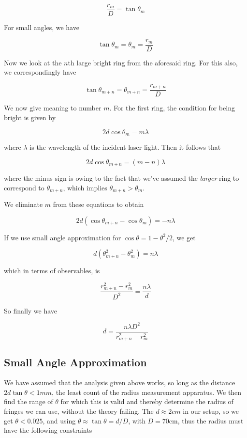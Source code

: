 \[
\frac{r_{m}}{D}=\tan\theta_{m}
\]


For small angles, we have

\[
\tan\theta_{m}=\theta_{m}=\frac{r_{m}}{D}
\]


Now we look at the $n$th large bright ring from the aforesaid ring.
For this also, we correspondingly have

\[
\tan\theta_{m+n}=\theta_{m+n}=\frac{r_{m+n}}{D}
\]


We now give meaning to number $m$. For the first ring, the condition
for being bright is given by 

\[
2d\cos\theta_{m}=m\lambda
\]


where $\lambda$ is the wavelength of the incident laser light. Then
it follows that

\[
2d\cos\theta_{m+n}=(m-n)\lambda
\]


where the minus sign is owing to the fact that we've assumed the \emph{larger
}ring to correspond to $\theta_{m+n}$, which implies $\theta_{m+n}>\theta_{m}$.

We eliminate $m$ from these equations to obtain

\[
2d(\cos\theta_{m+n}-\cos\theta_{m})=-n\lambda
\]


If we use small angle approximation for $\cos\theta=1-\theta^{2}/2$,
we get

\[
d(\theta_{m+n}^{2}-\theta_{m}^{2})=n\lambda
\]


which in terms of observables, is

\[
\frac{r_{m+n}^{2}-r_{m}^{2}}{D^{2}}=\frac{n\lambda}{d}
\]


So finally we have

\[
d=\frac{n\lambda D^{2}}{r_{m+n}^{2}-r_{m}^{2}}
\]



\subsection{Small Angle Approximation}

We have assumed that the analysis given above works, so long as the
distance $2d\tan\theta<1mm$, the least count of the radius measurement
apparatus. We then find the range of $\theta$ for which this is valid
and thereby determine the radius of fringes we can use, without the
theory failing. The $d\approx2cm$ in our setup, so we get $\theta<0.025$,
and using $\theta\approx\tan\theta=d/D$, with $D=70$cm, thus the
radius must have the following constraints

